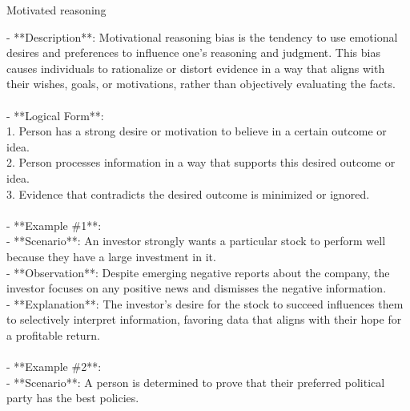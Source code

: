 \documentclass[a4paper,12pt,single,pdftex]{scrbook}
\begin{document}
Motivated reasoning
    
      - **Description**: Motivational reasoning bias is the tendency to use emotional desires and preferences to influence one's reasoning and judgment. This bias causes individuals to rationalize or distort evidence in a way that aligns with their wishes, goals, or motivations, rather than objectively evaluating the facts.
    \\

    
      
    \\

    
      - **Logical Form**:
    \\

    
        1. Person has a strong desire or motivation to believe in a certain outcome or idea.
    \\

    
        2. Person processes information in a way that supports this desired outcome or idea.
    \\

    
        3. Evidence that contradicts the desired outcome is minimized or ignored.
    \\

    
      
    \\

    
      - **Example \#1**:
    \\

    
        - **Scenario**: An investor strongly wants a particular stock to perform well because they have a large investment in it.
    \\

    
        - **Observation**: Despite emerging negative reports about the company, the investor focuses on any positive news and dismisses the negative information.
    \\

    
        - **Explanation**: The investor’s desire for the stock to succeed influences them to selectively interpret information, favoring data that aligns with their hope for a profitable return.
    \\

    
      
    \\

    
      - **Example \#2**:
    \\

    
        - **Scenario**: A person is determined to prove that their preferred political party has the best policies.
    \\
\end{document}
